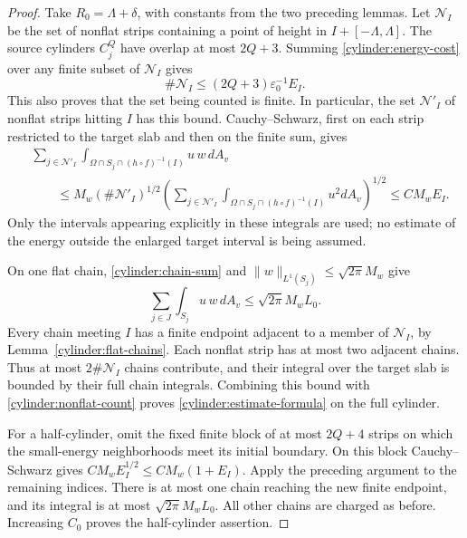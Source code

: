 \begin{proof}
Take $R_0=\Lambda+\delta$, with constants from the two preceding
lemmas.  Let $\mathcal N_I$ be the set of nonflat strips containing
a point of height in $I+[-\Lambda,\Lambda]$.  The source cylinders
$C_j^Q$ have overlap at most $2Q+3$.  Summing
\eqref{cylinder:energy-cost} over any finite subset of
$\mathcal N_I$ gives
\begin{equation}\label{cylinder:nonflat-count}
 \#\mathcal N_I\leq(2Q+3)\varepsilon_0^{-1}E_I.
\end{equation}
This also proves that the set being counted is finite.  In particular,
the set $\mathcal N'_I$ of nonflat strips hitting $I$ has this bound.
Cauchy--Schwarz, first on each strip restricted to the target slab and
then on the finite sum, gives
\[
 \begin{split}
 &\sum_{j\in\mathcal N'_I}
       \int_{\Omega\cap S_j\cap(h\circ f)^{-1}(I)}u\,w\,dA_v\\
 &\qquad\leq
 M_w(\#\mathcal N'_I)^{1/2}
 \left(\sum_{j\in\mathcal N'_I}
       \int_{\Omega\cap S_j\cap(h\circ f)^{-1}(I)}u^2dA_v\right)^{1/2}
 \leq C M_w E_I.
 \end{split}
\]
Only the intervals appearing explicitly in these integrals are used;
no estimate of the energy outside the enlarged target interval is
being assumed.

On one flat chain, \eqref{cylinder:chain-sum} and
$\|w\|_{L^1(S_j)}\leq\sqrt{2\pi}M_w$ give
\[
 \sum_{j\in J}\int_{S_j}u\,w\,dA_v
      \leq\sqrt{2\pi}M_wL_0.
\]
Every chain meeting $I$ has a finite endpoint adjacent to a member
of $\mathcal N_I$, by Lemma~\ref{cylinder:flat-chains}.
Each nonflat strip has at most two adjacent chains.  Thus at most
$2\#\mathcal N_I$ chains contribute, and their integral over the target
slab is bounded by their full chain integrals. Combining this bound
with \eqref{cylinder:nonflat-count} proves
\eqref{cylinder:estimate-formula} on the full cylinder.

For a half-cylinder, omit the fixed finite block of at most $2Q+4$
strips on which the small-energy neighborhoods meet its initial
boundary.  On this block Cauchy--Schwarz gives
$CM_wE_I^{1/2}\leq CM_w(1+E_I)$.  Apply the preceding argument to the
remaining indices.  There is at most one chain reaching the new
finite endpoint, and its integral is at most
$\sqrt{2\pi}M_wL_0$.  All other chains are charged as before.
Increasing $C_0$ proves the half-cylinder assertion.
\end{proof}

